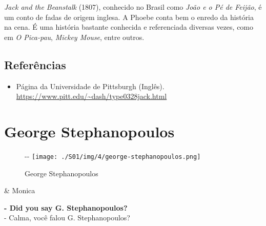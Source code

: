 \emph{Jack and the Beanstalk} (1807), conhecido no Brasil como
\emph{João e o Pé de Feijão}, é um conto de fadas de origem inglesa. A
Phoebe conta bem o enredo da história na cena. É uma história bastante
conhecida e referenciada diversas vezes, como em \emph{O Pica-pau},
\emph{Mickey Mouse}, entre outros.

\hypertarget{referuxeancias-2}{%
\subsection{Referências}\label{referuxeancias-2}}

\begin{itemize}
\tightlist
\item
  \sloppy Página da Universidade de Pittsburgh (Inglês). \url{https://www.pitt.edu/~dash/type0328jack.html}
\end{itemize}

\hypertarget{george-stephanopoulos}{%
\section{George Stephanopoulos}\label{george-stephanopoulos}}

\begin{figure}[!ht]
  \begin{adjustwidth}{-\oddsidemargin-1in}{-\rightmargin}
    \centering
    \texttt{[image: ./S01/img/4/george-stephanopoulos.png]}
    \caption{George Stephanopoulos\label{fig:george-stephanopoulos}}
  \end{adjustwidth}
\end{figure}

\begin{tcolorbox}[enhanced,center upper,
    drop fuzzy shadow southeast, boxrule=0.3pt,
    lower separated=false,
    colframe=black!30!dialogoBorder,colback=white]
\begin{minipage}[c]{0.14\linewidth}
   & \centering \scriptsize{Monica}
\end{minipage}
\hspace{.1mm}
\begin{minipage}[c]{0.8\linewidth}
  \textbf{- Did you say G. Stephanopoulos?}\\
  - Calma, você falou G. Stephanopoulos?
\end{minipage}
\end{tcolorbox}

